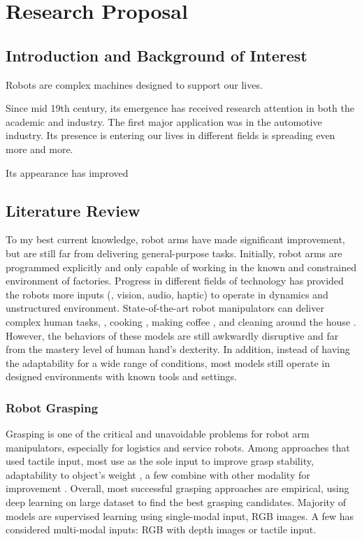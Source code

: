 \chapter{Research Proposal}

\section{Introduction and Background of Interest}


Robots are complex machines designed to support our lives.

Since mid 19th century, its emergence has received research attention in both the academic and industry. The first major application was in the automotive industry. Its presence is entering our lives in different fields is spreading even more and more.

Its appearance has improved 

\section{Literature Review}

To my best current knowledge, robot arms have made significant improvement, but are still far from delivering general-purpose tasks. Initially, robot arms are programmed explicitly and only capable of working in the known and constrained environment of factories. Progress in different fields of technology has provided the robots more inputs (\eg, vision, audio, haptic) to operate in dynamics and unstructured environment. State-of-the-art robot manipulators can deliver complex human tasks, \eg, cooking \cite{moley}, making coffee \cite{coffeemaster}, and cleaning around the house \cite{bothandy}. However, the behaviors of these models are still awkwardly disruptive and far from the mastery level of human hand's dexterity. In addition, instead of having the adaptability for a wide range of conditions, most models still operate in designed environments with known tools and settings.

\subsection{Robot Grasping}

Grasping is one of the critical and unavoidable problems for robot arm manipulators, especially for logistics and service robots. Among approaches that used tactile input, most use as the sole input to improve grasp stability, adaptability to object's weight \cite{bekiroglu2011assessing, li2014learning}, a few combine with other modality for improvement \cite{calandra2017feeling}. Overall, most successful grasping approaches are empirical, using deep learning on large dataset to find the best grasping candidates. Majority of models are supervised learning using single-modal input, \ie RGB images. A few has considered multi-modal inputs: RGB with depth images or tactile input. \cite{bohg2013data, caldera2018review, li2019review, kleeberger2020survey}

